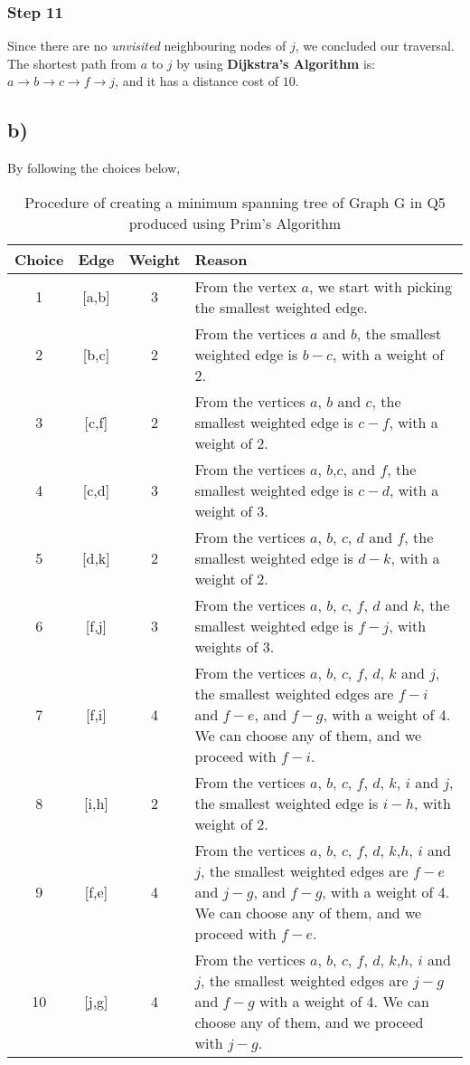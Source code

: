 \documentclass[11pt]{article}
\begin{document}
\subsubsection*{Step 11}
Since there are no \textit{unvisited} neighbouring nodes of $j$, we concluded our traversal. \\
The shortest path from $a$ to $j$ by using \textbf{Dijkstra's Algorithm} is: $ a \rightarrow b \rightarrow c \rightarrow f \rightarrow j$, and it has a distance cost of $10$.
\subsection*{b)}
By following the choices below, 
\begin{table}[H]
    \centering
    \renewcommand{\arraystretch}{1.25}
    \begin{tabular}{|c|c|c|p{114mm}|}	
    \hline 							
   \textbf{Choice} & \textbf{Edge} & \textbf{Weight} & \textbf{Reason} \\
    \hline 
    \hline 
    1 & [a,b] & 3 & From the vertex $a$, we start with picking the smallest weighted edge. \\ \hline
    2 & [b,c] & 2 & From the vertices $a$ and $b$, the smallest weighted edge is $b-c$, with a weight of 2. \\ \hline
    3 & [c,f] & 2 & From the vertices $a$, $b$ and $c$, the smallest weighted edge is $c-f$, with a weight of 2.\\ \hline
    4 & [c,d] & 3 & From the vertices  $a$, $b$,$c$, and $f$, the smallest weighted edge is $c-d$, with a weight of 3.\\ \hline
    5 & [d,k] & 2 & From the vertices $a$, $b$, $c$, $d$ and $f$, the smallest weighted edge is $d-k$, with a weight of 2. \\ \hline
    6 & [f,j] & 3 & From the vertices $a$, $b$, $c$, $f$, $d$ and $k$, the smallest weighted edge is $f-j$, with weights of 3.\\ \hline
    7 & [f,i] & 4 & From the vertices $a$, $b$, $c$, $f$, $d$, $k$ and $j$, the smallest weighted edges are $f-i$ and $f-e$, and $f-g$, with a weight of 4.  We can choose any of them, and we proceed with $f-i$.\\ \hline
    8 & [i,h] & 2 & From the vertices $a$, $b$, $c$, $f$, $d$, $k$, $i$ and $j$, the smallest weighted edge is $i-h$, with weight of 2. \\ \hline
    9 & [f,e] & 4 & From the vertices $a$, $b$, $c$, $f$, $d$, $k$,$h$, $i$ and $j$, the smallest weighted edges are $f-e$ and $j-g$, and $f-g$, with a weight of 4. We can choose any of them, and we proceed with $f-e$.\\ \hline
    10 & [j,g] & 4 & From the vertices $a$, $b$, $c$, $f$, $d$, $k$,$h$, $i$ and $j$, the smallest weighted edges are $j-g$ and $f-g$ with a weight of 4. We can choose any of them, and we proceed with $j-g$. \\ \hline        
    \end{tabular}
    \caption{ Procedure of creating a minimum spanning tree of Graph G in Q5 produced using Prim's Algorithm }
    \end{table}
    
\end{document}
